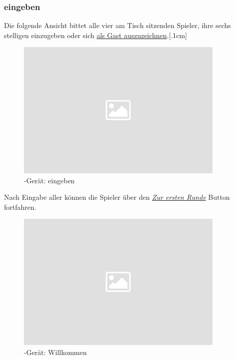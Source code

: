 \subsubsection{\dbvns eingeben}\label{cli/dbv}

\noindent
Die folgende Ansicht bittet alle vier am Tisch sitzenden Spieler, ihre
sechs stelligen \dbvns einzugeben oder sich \hyperref[cli/dbv_guest]{als Gast auszuzeichnen}.[.1cm]

\noindent
\begin{figure}[ht]
	\centering
  \includegraphics[width=10cm]{pictures/placeholder.png}
	\caption{\cli-Gerät: \dbvns eingeben}
	\label{pic/cli_1_dbv}
\end{figure}

\noindent
Nach Eingabe aller \dbvns können die Spieler über den \hyperref[cli/newround]{\textit{Zur ersten Runde}} Button fortfahren.\\[.1cm]

\noindent
\begin{figure}[ht]
	\centering
  \includegraphics[width=10cm]{pictures/placeholder.png}
	\caption{\cli-Gerät: Willkommen}
	\label{pic/cli_0_welcome}
\end{figure}
